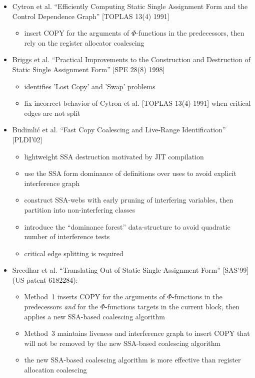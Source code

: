 \begin{itemize}

\item Cytron et al. ``Efficiently Computing Static Single Assignment Form and
the Control Dependence Graph'' [TOPLAS 13(4) 1991]
\begin{itemize}
\item insert COPY for the arguments of $\Phi$-functions in the predecessors,
then rely on the register allocator coalescing
\end{itemize}

\item Briggs et al. ``Practical Improvements to the Construction and Destruction
of Static Single Assignment Form'' [SPE 28(8) 1998]

\begin{itemize}
\item identifies 'Lost Copy' and 'Swap' problems
\item fix incorrect behavior of Cytron et al. [TOPLAS 13(4) 1991]
when critical edges are not split
\end{itemize}

\item Budimli\'c et al. ``Fast Copy Coalescing and Live-Range Identification''
[PLDI'02]

\begin{itemize}
\item lightweight SSA destruction motivated by JIT compilation
\item use the SSA form dominance of definitions over uses to avoid explicit
interference graph
\item construct SSA-webs with early pruning of interfering variables, then
partition into non-interfering classes
\item introduce the ``dominance forest'' data-structure to avoid quadratic
number of interference tests
\item critical edge splitting is required
\end{itemize}

\item Sreedhar et al. ``Translating Out of Static Single Assignment Form''
[SAS'99] (US patent 6182284):

\begin{itemize}
\item Method~1 inserts COPY for the arguments of $\Phi$-functions in the
predecessors \emph{and} for the $\Phi$-functions targets in the current block,
then applies a new SSA-based coalescing algorithm
\item Method~3 maintains liveness and interference graph to insert COPY that will not
be removed by the new SSA-based coalescing algorithm
\item the new SSA-based coalescing algorithm is more effective than register allocation
coalescing
\end{itemize}


\end{itemize}
